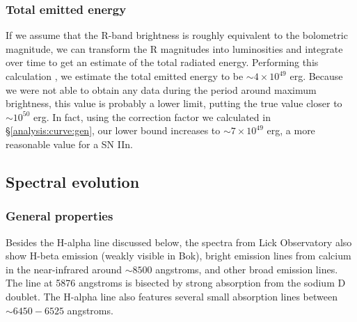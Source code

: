 \documentclass[iop]{emulateapj}
\begin{document}
\subsubsection{Total emitted energy} \label{analysis:curve:energy}
If we assume that the R-band brightness is roughly equivalent to the bolometric magnitude, we can transform the R magnitudes into luminosities and integrate over time to get an estimate of the total radiated energy. Performing this calculation \citep{Are99}, we estimate the total emitted energy to be $\sim4 \times 10^{49}$ erg. Because we were not able to obtain any data during the period around maximum brightness, this value is probably a lower limit, putting the true value closer to $\sim10^{50}$ erg. In fact, using the correction factor we calculated in \S \ref{analysis:curve:gen}, our lower bound increases to $\sim7 \times 10^{49}$ erg, a more reasonable value for a SN IIn.

\subsection{Spectral evolution} \label{analysis:spec}
\subsubsection{General properties} \label{analysis:spec:gen}
Besides the H-alpha line discussed below, the spectra from Lick Observatory also show H-beta emission (weakly visible in Bok), bright emission lines from calcium in the near-infrared around $\sim8500$ angstroms, and other broad emission lines. The line at 5876 angstroms is bisected by strong absorption from the sodium D doublet. The H-alpha line also features several small absorption lines between $\sim6450-6525$ angstroms.
\end{document}
